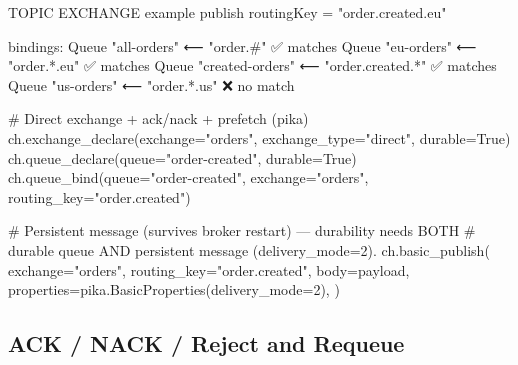 \documentclass[11pt]{article}
\newenvironment{Shaded}{\begin{snugshade}}{\end{snugshade}}
\newcommand{\CommentTok}[1]{\textcolor[rgb]{0.48,0.49,0.49}{#1}}
\newcommand{\DecValTok}[1]{\textcolor[rgb]{0.96,0.45,0.00}{#1}}
\newcommand{\NormalTok}[1]{\textcolor[rgb]{0.81,0.81,0.76}{#1}}
\newcommand{\OperatorTok}[1]{\textcolor[rgb]{0.81,0.81,0.76}{#1}}
\newcommand{\StringTok}[1]{\textcolor[rgb]{0.96,0.31,0.31}{#1}}
\newcommand{\VariableTok}[1]{\textcolor[rgb]{0.15,0.68,0.68}{#1}}
\begin{document}
\begin{Shaded}
\begin{Highlighting}[]
\NormalTok{TOPIC EXCHANGE example}
\NormalTok{publish routingKey }\OperatorTok{=} \StringTok{"order.created.eu"}

\NormalTok{bindings:}
\NormalTok{  Queue }\StringTok{"all{-}orders"}\NormalTok{     ⟵ }\StringTok{"order.\#"}\NormalTok{          ✅ matches}
\NormalTok{  Queue }\StringTok{"eu{-}orders"}\NormalTok{      ⟵ }\StringTok{"order.*.eu"}\NormalTok{       ✅ matches}
\NormalTok{  Queue }\StringTok{"created{-}orders"}\NormalTok{ ⟵ }\StringTok{"order.created.*"}\NormalTok{  ✅ matches}
\NormalTok{  Queue }\StringTok{"us{-}orders"}\NormalTok{      ⟵ }\StringTok{"order.*.us"}\NormalTok{       ❌ no match}
\end{Highlighting}
\end{Shaded}


\begin{Shaded}
\begin{Highlighting}[]
\CommentTok{\# Direct exchange + ack/nack + prefetch (pika)}
\NormalTok{ch.exchange\_declare(exchange}\OperatorTok{=}\StringTok{"orders"}\NormalTok{, exchange\_type}\OperatorTok{=}\StringTok{"direct"}\NormalTok{, durable}\OperatorTok{=}\VariableTok{True}\NormalTok{)}
\NormalTok{ch.queue\_declare(queue}\OperatorTok{=}\StringTok{"order{-}created"}\NormalTok{, durable}\OperatorTok{=}\VariableTok{True}\NormalTok{)}
\NormalTok{ch.queue\_bind(queue}\OperatorTok{=}\StringTok{"order{-}created"}\NormalTok{, exchange}\OperatorTok{=}\StringTok{"orders"}\NormalTok{, routing\_key}\OperatorTok{=}\StringTok{"order.created"}\NormalTok{)}

\CommentTok{\# Persistent message (survives broker restart) — durability needs BOTH}
\CommentTok{\# durable queue AND persistent message (delivery\_mode=2).}
\NormalTok{ch.basic\_publish(}
\NormalTok{    exchange}\OperatorTok{=}\StringTok{"orders"}\NormalTok{, routing\_key}\OperatorTok{=}\StringTok{"order.created"}\NormalTok{,}
\NormalTok{    body}\OperatorTok{=}\NormalTok{payload,}
\NormalTok{    properties}\OperatorTok{=}\NormalTok{pika.BasicProperties(delivery\_mode}\OperatorTok{=}\DecValTok{2}\NormalTok{),}
\NormalTok{)}
\end{Highlighting}
\end{Shaded}

\subsection{ACK / NACK / Reject and Requeue}\label{ack--nack--reject-and-requeue}
\end{document}
